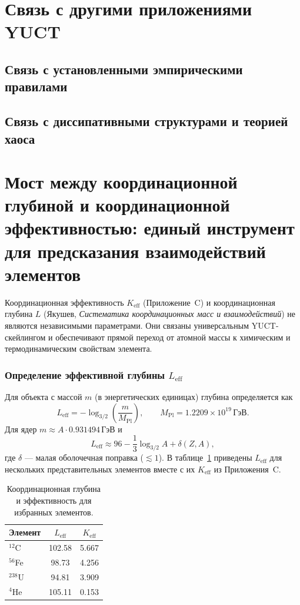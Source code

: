 \documentclass[12pt,a4paper]{article}
\theoremstyle{remark}
\begin{document}
	\section{Связь с другими приложениями YUCT}
	\subsection{Связь с установленными эмпирическими правилами}
	\subsection{Связь с диссипативными структурами и теорией хаоса}
	
	\section{Мост между координационной глубиной и координационной эффективностью: единый инструмент для предсказания взаимодействий элементов}
	\label{subsec:bridge}
	
	Координационная эффективность \(K_{\mathrm{eff}}\) (Приложение~C) и координационная глубина \(L\) (Якушев, \textit{Систематика координационных масс и взаимодействий}\cite{YKmass}) не являются независимыми параметрами.  
	Они связаны универсальным YUCT-скейлингом и обеспечивают прямой переход от атомной массы к химическим и термодинамическим свойствам элемента.
	
	\subsubsection{Определение эффективной глубины \(L_{\mathrm{eff}}\)}
	Для объекта с массой \(m\) (в энергетических единицах) глубина определяется как
	\begin{equation}
		L_{\mathrm{eff}} = -\log_{3/2}\!\left(\frac{m}{M_{\mathrm{Pl}}}\right),
		\qquad M_{\mathrm{Pl}} = 1.2209\times10^{19}\,\text{ГэВ}.
	\end{equation}
	Для ядер \(m \approx A \cdot 0.931494\,\text{ГэВ}\) и
	\begin{equation}
		L_{\mathrm{eff}} \approx 96 - \frac{1}{3}\log_{3/2}A + \delta(Z,A),
	\end{equation}
	где \(\delta\) — малая оболочечная поправка (\(\lesssim 1\)).  
	В таблице~\ref{tab:L_Keff} приведены \(L_{\mathrm{eff}}\) для нескольких представительных элементов вместе с их \(K_{\mathrm{eff}}\) из Приложения~C.
	
	\begin{table}[htbp]
		\centering
		\caption{Координационная глубина и эффективность для избранных элементов.}
		\label{tab:L_Keff}
		\begin{tabular}{@{}lcc@{}}
			\toprule
			Элемент & \(L_{\mathrm{eff}}\) & \(K_{\mathrm{eff}}\) \\
			\midrule
			$^{12}$C & 102.58 & 5.667 \\
			$^{56}$Fe & 98.73 & 4.256 \\
			$^{238}$U & 94.81 & 3.909 \\
			$^{4}$He & 105.11 & 0.153 \\
			\bottomrule
		\end{tabular}
	\end{table}
	
\end{document}
